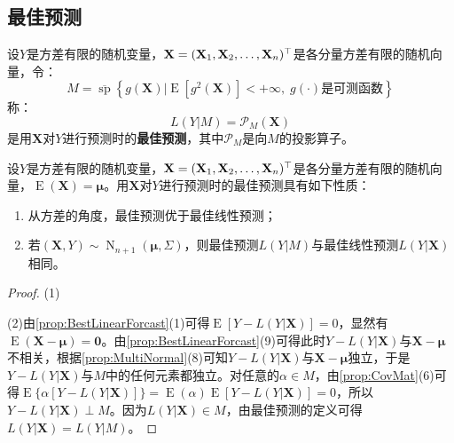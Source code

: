 \subsection{最佳预测}
\begin{definition}
	设$Y$是方差有限的随机变量，$\mathbf{X}=(\mathbf{X}_1, \mathbf{X}_2, \dots, \mathbf{X}_{n})^{\top}$是各分量方差有限的随机向量，令：
	\begin{equation*}
		M=\overline{\operatorname{sp}}\left\{g(\mathbf{X})|\operatorname{E}[g^2(\mathbf{X})]<+\infty,\;g(\cdot)\text{是可测函数}\right\}
	\end{equation*}
	称：
	\begin{equation*}
		L(Y|M)=\mathcal{P}_M(\mathbf{X})
	\end{equation*}
	是用$\mathbf{X}$对$Y$进行预测时的\textbf{最佳预测}，其中$\mathcal{P}_M$是向$M$的投影算子。
\end{definition}
\begin{property}
	设$Y$是方差有限的随机变量，$\mathbf{X}=(\mathbf{X}_1, \mathbf{X}_2, \dots, \mathbf{X}_{n})^{\top}$是各分量方差有限的随机向量，$\operatorname{E}(\mathbf{X})=\boldsymbol{\mu}$。用$\mathbf{X}$对$Y$进行预测时的最佳预测具有如下性质：
	\begin{enumerate}
		\item 从方差的角度，最佳预测优于最佳线性预测；
		\item 若$(\mathbf{X},Y)\sim\operatorname{N}_{n+1}(\boldsymbol{\mu},\Sigma)$，则最佳预测$L(Y|M)$与最佳线性预测$L(Y|\mathbf{X})$相同。
	\end{enumerate}
\end{property}
\begin{proof}
	(1)\par
	(2)由\cref{prop:BestLinearForcast}(1)可得$\operatorname{E}[Y-L(Y|\mathbf{X})]=0$，显然有$\operatorname{E}(\mathbf{X}-\boldsymbol{\mu})=\mathbf{0}$。由\cref{prop:BestLinearForcast}(9)可得此时$Y-L(Y|\mathbf{X})$与$\mathbf{X}-\boldsymbol{\mu}$不相关，根据\cref{prop:MultiNormal}(8)可知$Y-L(Y|\mathbf{X})$与$\mathbf{X}-\boldsymbol{\mu}$独立，于是$Y-L(Y|\mathbf{X})$与$M$中的任何元素都独立。对任意的$\alpha\in M$，由\cref{prop:CovMat}(6)可得$\operatorname{E}\{\alpha[Y-L(Y|\mathbf{X})]\}=\operatorname{E}(\alpha)\operatorname{E}[Y-L(Y|\mathbf{X})]=0$，所以$Y-L(Y|\mathbf{X})\perp M$。因为$L(Y|\mathbf{X})\in M$，由最佳预测的定义可得$L(Y|\mathbf{X})=L(Y|M)$。
\end{proof}